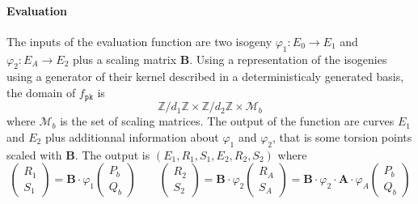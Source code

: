 \documentclass[11pt]{article}
\begin{document}
		\paragraph{Evaluation} The inputs of the evaluation function are two isogeny
		$\varphi_1:E_0\to E_1$ and $\varphi_2:E_A\to E_2$ plus a scaling matrix $\mathbf B$.
		Using a representation of the isogenies using a generator of their kernel described
		in a deterministicaly generated basis, the domain of $f_\mathtt{pk}$ is
		$$\mathbb{Z}/d_1\mathbb{Z}\times\mathbb{Z}/d_2\mathbb{Z}\times\mathcal M_b$$
		where $\mathcal M_b$ is the set of scaling matrices.
		The output of the function are curves $E_1$ and $E_2$ plus additionnal information
		about $\varphi_1$ and $\varphi_2$, that is some torsion points scaled with $\mathbf B$.
		The output is $(E_1,R_1,S_1,E_2,R_2,S_2)$ where
		\[
		\begin{pmatrix} R_1 \\ S_1 \end{pmatrix} = \mathbf B \cdot \varphi_1 
		\begin{pmatrix} P_b \\ Q_b \end{pmatrix}\quad\quad
		\begin{pmatrix} R_2 \\ S_2 \end{pmatrix} = \mathbf B \cdot\varphi_2
		\begin{pmatrix} R_A \\ S_A \end{pmatrix} = \mathbf B\cdot\varphi_2\cdot\mathbf A
		\cdot\varphi_A \begin{pmatrix} P_b \\ Q_b \end{pmatrix} 
		\] 
\end{document}
